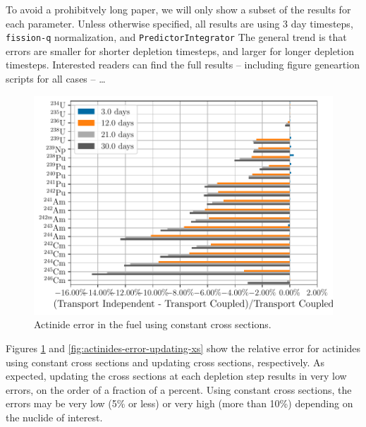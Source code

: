    To avoid a prohibitvely long paper, we will only show a subset of the
    results for each parameter. Unless otherwise specified, all results are
    using 3 day timesteps, \verb.fission-q. normalization, and
    \verb.PredictorIntegrator.  The general trend is that errors are smaller for
    shorter depletion timesteps, and larger for longer depletion timesteps.
    Interested readers can find the full results -- including figure geneartion
    scripts for all cases --  \ldots



    \begin{figure}[h!tpb]
        \centering
        \includegraphics[width=\linewidth]{figs/actinides_constant_xs_predictor_fission_q_days.pdf}
        \caption[]{Actinide error in the fuel using constant cross sections.}
        \label{fig:actinides-error-constant-xs}
    \end{figure}

    Figures \ref{fig:actinides-error-constant-xs} and
    \ref{fig:actinides-error-updating-xs} show the relative error for actinides
    using constant cross sections and updating cross sections, respectively.  As
    expected, updating the cross sections at each depletion step results in very
    low errors, on the order of a fraction of a percent.  Using constant cross
    sections, the errors may be very low (5\% or less) or very high (more than
    10\%) depending on the nuclide of interest.

